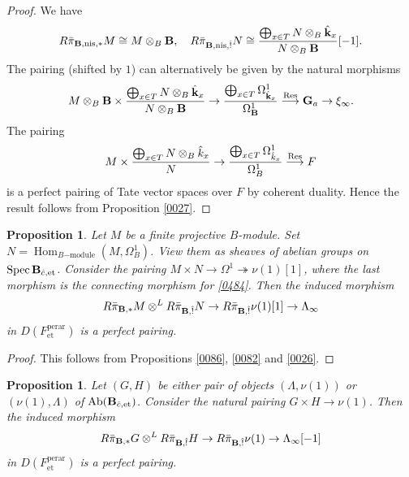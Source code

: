 \documentclass{amsart}
\newtheorem{Prop}[Thm]{Proposition}
\theoremstyle{remark}
\numberwithin{equation}{subsection}
\newcommand{\onto}{\twoheadrightarrow}
\newcommand{\tensor}{\mathbin{\otimes}}
\newcommand{\et}{\mathrm{et}}
\newcommand{\Ga}{\mathbf{G}_{a}}
\newcommand{\perar}{\mathrm{perar}}
\newcommand{\alg}[1]{\mathbf{#1}}
\newcommand{\nis}{\mathrm{nis}}
\DeclareMathOperator{\Hom}{Hom}
\DeclareMathOperator{\Spec}{Spec}
\DeclareMathOperator{\Ab}{Ab}
\DeclareMathOperator{\Res}{Res}
\begin{document}
\begin{proof}
	We have
		\[
				R \Bar{\pi}_{\alg{B}, \nis, \ast} M
			\cong
				M \tensor_{B} \alg{B},
			\quad
				R \Bar{\pi}_{\alg{B}, \nis, \Hat{!}} N
			\cong
				\frac{
					\bigoplus_{x \in T}
						N \tensor_{B} \Hat{\alg{k}}_{x}
				}{
					N \tensor_{B} \alg{B}
				}[-1].
		\]
	The pairing (shifted by $1$) can alternatively be given by the natural morphisms
		\[
					M \tensor_{B} \alg{B}
				\times
					\frac{
						\bigoplus_{x \in T}
							N \tensor_{B} \Hat{\alg{k}}_{x}
					}{
						N \tensor_{B} \alg{B}
					}
			\to
				\frac{
					\bigoplus_{x \in T}
						\Omega_{\Hat{\alg{k}}_{x}}^{1}
				}{
					\Omega_{\alg{B}}^{1}
				}
			\stackrel{\Res}{\longrightarrow}
				\Ga
			\to
				\xi_{\infty}.
		\]
	The pairing
		\[
					M
				\times
					\frac{
						\bigoplus_{x \in T}
							N \tensor_{B} \Hat{k}_{x}
					}{
						N
					}
			\to
				\frac{
					\bigoplus_{x \in T}
						\Omega_{\Hat{k}_{x}}^{1}
				}{
					\Omega_{B}^{1}
				}
			\stackrel{\Res}{\longrightarrow}
				F
		\]
	is a perfect pairing of Tate vector spaces over $F$ by coherent duality.
	Hence the result follows from
	Proposition \ref{0027}.
\end{proof}

\begin{Prop} \label{0483}
	Let $M$ be a finite projective $B$-module.
	Set $N = \Hom_{B\mathrm{-module}}(M, \Omega_{B}^{1})$.
	View them as sheaves of abelian groups on $\Spec \alg{B}_{\Hat{c}, \et}$.
	Consider the pairing $M \times N \to \Omega^{1} \onto \nu(1)[1]$,
	where the last morphism is the connecting morphism for \eqref{0484}.
	Then the induced morphism
		\[
					R \Bar{\pi}_{\alg{B}, \ast} M
				\tensor^{L}
					R \Bar{\pi}_{\alg{B}, \Hat{!}} N
			\to
				R \Bar{\pi}_{\alg{B}, \Hat{!}} \nu(1)[1]
			\to
				\Lambda_{\infty}
		\]
	in $D(F^{\perar}_{\et})$ is a perfect pairing.
\end{Prop}

\begin{proof}
	This follows from Propositions \ref{0086}, \ref{0082} and \ref{0026}.
\end{proof}

\begin{Prop} \label{0087}
	Let $(G, H)$ be either pair of objects
	$(\Lambda, \nu(1))$ or $(\nu(1), \Lambda)$
	of $\Ab(\alg{B}_{\Hat{c}, \et})$.
	Consider the natural pairing $G \times H \to \nu(1)$.
	Then the induced morphism
		\[
					R \Bar{\pi}_{\alg{B}, \ast} G
				\tensor^{L}
					R \Bar{\pi}_{\alg{B}, \Hat{!}} H
			\to
				R \Bar{\pi}_{\alg{B}, \Hat{!}} \nu(1)
			\to
				\Lambda_{\infty}[-1]
		\]
	in $D(F^{\perar}_{\et})$ is a perfect pairing.
\end{Prop}
\end{document}

